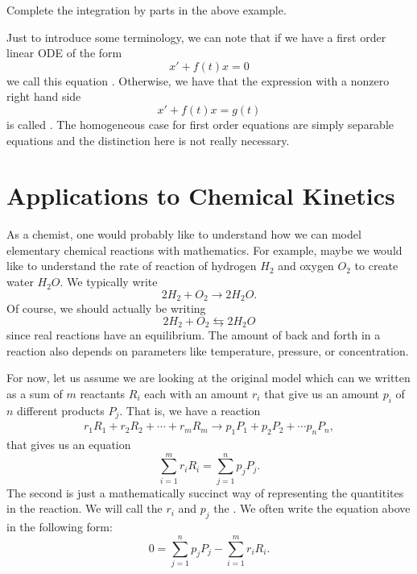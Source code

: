         \begin{exercise}
            Complete the integration by parts in the above example.
        \end{exercise}
        
        Just to introduce some terminology, we can note that if we have a first order linear ODE of the form
        \[
        x'+f(t)x=0
        \]
        we call this equation .  Otherwise, we have that the expression with a nonzero right hand side
        \[
        x'+ f(t)x=g(t)
        \]
        is called .  The homogeneous case for first order equations are simply separable equations and the distinction here is not really necessary.
        
        \section{Applications to Chemical Kinetics}
        As a chemist, one would probably like to understand how we can model elementary chemical reactions with mathematics.  For example, maybe we would like to understand the rate of reaction of hydrogen $H_2$ and oxygen $O_2$ to create water $H_2 O$. We typically write
        \[
        2H_2 + O_2 \to 2H_2O.
        \]
        \noindent Of course, we should actually be writing
        \[
        2H_2 + O_2 \leftrightarrows 2H_2O
        \]
        since real reactions have an equilibrium.  The amount of back and forth in a reaction also depends on parameters like temperature, pressure, or concentration.
        
        For now, let us assume we are looking at the original model which can we written as a sum of $m$ reactants $R_i$ each with an amount $r_i$ that give us an amount $p_i$ of $n$ different products $P_j$. That is, we have a reaction
        \begin{align*}
            r_1R_1 + r_2R_2 + \cdots + r_mR_m \to p_1 P_1 + p_2P_2 +\cdots p_n P_n,
        \end{align*}
        that gives us an equation
        \[
        \sum_{i=1}^m r_iR_i = \sum_{j=1}^n p_jP_j.
        \]
        The second is just a mathematically succinct way of representing the quantitites in the reaction. We will call the $r_i$ and $p_j$ the . We often write the equation above in the following form:
        \begin{equation}
        0=\sum_{j=1}^n p_j P_j - \sum_{i=1}^m r_iR_i. \label{eq:stoich}
        \end{equation}
        
